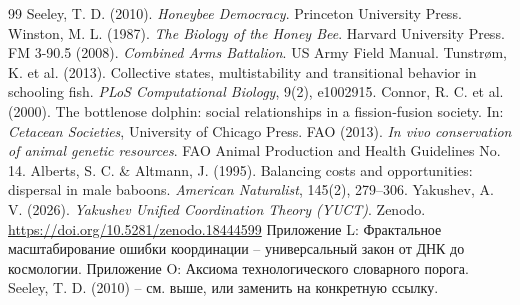 \documentclass[12pt]{article}
\theoremstyle{remark}
\begin{document}
	\begin{thebibliography}{99}
		 Seeley, T. D. (2010). \emph{Honeybee Democracy}. Princeton University Press.
		 Winston, M. L. (1987). \emph{The Biology of the Honey Bee}. Harvard University Press.
		 FM 3-90.5 (2008). \emph{Combined Arms Battalion}. US Army Field Manual.
		 Tunstrøm, K. et al. (2013). Collective states, multistability and transitional behavior in schooling fish. \emph{PLoS Computational Biology}, 9(2), e1002915.
		 Connor, R. C. et al. (2000). The bottlenose dolphin: social relationships in a fission‑fusion society. In: \emph{Cetacean Societies}, University of Chicago Press.
		 FAO (2013). \emph{In vivo conservation of animal genetic resources}. FAO Animal Production and Health Guidelines No. 14.
		 Alberts, S. C. \& Altmann, J. (1995). Balancing costs and opportunities: dispersal in male baboons. \emph{American Naturalist}, 145(2), 279–306.
		 Yakushev, A. V. (2026). \emph{Yakushev Unified Coordination Theory (YUCT)}. Zenodo. \url{https://doi.org/10.5281/zenodo.18444599}
		 Приложение L: Фрактальное масштабирование ошибки координации – универсальный закон от ДНК до космологии.
		 Приложение O: Аксиома технологического словарного порога.
		 Seeley, T. D. (2010) – см. выше, или заменить на конкретную ссылку.
	\end{thebibliography}
	
\end{document}
